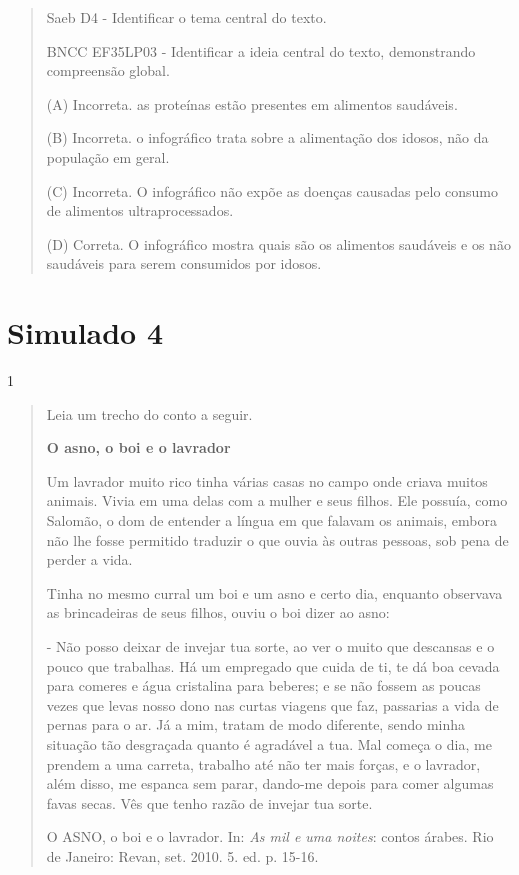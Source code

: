 \begin{escolha}
\begin{escolha}
{\begin{quote}
Saeb D4 - Identificar o tema central do texto.

BNCC EF35LP03 - Identificar a ideia central do texto, demonstrando
compreensão global.

(A) Incorreta. as proteínas estão presentes em alimentos saudáveis.

(B) Incorreta. o infográfico trata sobre a alimentação dos idosos, não
da população em geral.

(C) Incorreta. O infográfico não expõe as doenças causadas pelo consumo
de alimentos ultraprocessados.

(D) Correta. O infográfico mostra quais são os alimentos saudáveis e os
não saudáveis para serem consumidos por idosos.
\end{quote}

\chapter{Simulado 4}

\num{1}

\begin{quote}
Leia um trecho do conto a seguir.

\textbf{O asno, o boi e o lavrador}

Um lavrador muito rico tinha várias casas no campo onde criava muitos
animais. Vivia em uma delas com a mulher e seus filhos. Ele possuía,
como Salomão, o dom de entender a língua em que falavam os animais,
embora não lhe fosse permitido traduzir o que ouvia às outras pessoas,
sob pena de perder a vida.

Tinha no mesmo curral um boi e um asno e certo dia, enquanto observava
as brincadeiras de seus filhos, ouviu o boi dizer ao asno:

- Não posso deixar de invejar tua sorte, ao ver o muito que descansas e
o pouco que trabalhas. Há um empregado que cuida de ti, te dá boa cevada
para comeres e água cristalina para beberes; e se não fossem as poucas
vezes que levas nosso dono nas curtas viagens que faz, passarias a vida
de pernas para o ar. Já a mim, tratam de modo diferente, sendo minha
situação tão desgraçada quanto é agradável a tua. Mal começa o dia, me
prendem a uma carreta, trabalho até não ter mais forças, e o lavrador,
além disso, me espanca sem parar, dando-me depois para comer algumas
favas secas. Vês que tenho razão de invejar tua sorte.

O ASNO, o boi e o lavrador. In: \emph{As mil e uma noites}: contos
árabes. Rio de Janeiro: Revan, set. 2010. 5. ed. p. 15-16.


\end{quote}}
\end{escolha}
\end{escolha}
